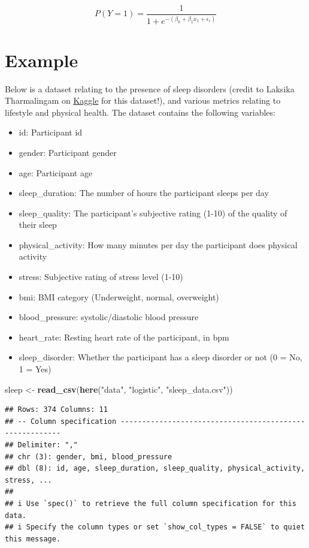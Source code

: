 \documentclass[
]{book}
\newenvironment{Shaded}{\begin{snugshade}}{\end{snugshade}}
\newcommand{\FunctionTok}[1]{\textcolor[rgb]{0.13,0.29,0.53}{\textbf{#1}}}
\newcommand{\NormalTok}[1]{#1}
\newcommand{\OtherTok}[1]{\textcolor[rgb]{0.56,0.35,0.01}{#1}}
\newcommand{\StringTok}[1]{\textcolor[rgb]{0.31,0.60,0.02}{#1}}
\providecommand{\tightlist}{%
  \setlength{\itemsep}{0pt}\setlength{\parskip}{0pt}}
\begin{document}
\[
P(Y = 1) = \frac{1}{1 + e^{-(\beta_0 + \beta_1 x_1 + \epsilon_i)}} 
\]

\section{Example}\label{example-8}

Below is a dataset relating to the presence of sleep disorders (credit to Laksika Tharmalingam on \href{https://www.kaggle.com/datasets/uom190346a/sleep-health-and-lifestyle-dataset}{Kaggle} for this dataset!), and various metrics relating to lifestyle and physical health. The dataset contains the following variables:

\begin{itemize}
\tightlist
\item
  id: Participant id
\item
  gender: Participant gender
\item
  age: Participant age
\item
  sleep\_duration: The number of hours the participant sleeps per day
\item
  sleep\_quality: The participant's subjective rating (1-10) of the quality of their sleep
\item
  physical\_activity: How many minutes per day the participant does physical activity
\item
  stress: Subjective rating of stress level (1-10)
\item
  bmi: BMI category (Underweight, normal, overweight)
\item
  blood\_pressure: systolic/diastolic blood pressure
\item
  heart\_rate: Resting heart rate of the participant, in bpm
\item
  sleep\_disorder: Whether the participant has a sleep disorder or not (0 = No, 1 = Yes)
\end{itemize}

\begin{Shaded}
\begin{Highlighting}[]
\NormalTok{sleep }\OtherTok{\textless{}{-}} \FunctionTok{read\_csv}\NormalTok{(}\FunctionTok{here}\NormalTok{(}\StringTok{"data"}\NormalTok{, }\StringTok{"logistic"}\NormalTok{, }\StringTok{"sleep\_data.csv"}\NormalTok{))}
\end{Highlighting}
\end{Shaded}

\begin{verbatim}
## Rows: 374 Columns: 11
## -- Column specification --------------------------------------------------------
## Delimiter: ","
## chr (3): gender, bmi, blood_pressure
## dbl (8): id, age, sleep_duration, sleep_quality, physical_activity, stress, ...
## 
## i Use `spec()` to retrieve the full column specification for this data.
## i Specify the column types or set `show_col_types = FALSE` to quiet this message.
\end{verbatim}
\end{document}
